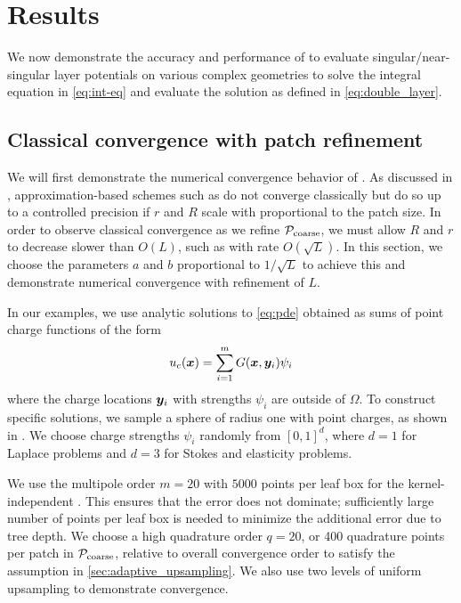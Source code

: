 \section{Results\label{sec:results}}
We now demonstrate the accuracy and performance of \qbkix to evaluate singular/near-singular layer potentials on various complex geometries to solve the integral equation in \cref{eq:int-eq} and evaluate the solution as defined in \cref{eq:double_layer}.

\subsection{Classical convergence with patch refinement}
We will first demonstrate the numerical convergence behavior of \qbkix.
As discussed in \cite[Section 3.1]{KBGN}, approximation-based schemes such as \qbkix do not converge classically but do so up to a controlled precision if $r$ and $R$ scale with proportional to the patch size. 
In order to observe classical convergence as we refine ${\mathcal{P}_{\mathrm{coarse}}}$, we must allow $R$ and $r$ to decrease slower than $O(L)$, such as with rate $O(\sqrt{L})$.
In this section, we choose the \qbkix parameters $a$ and $b$ proportional to $1/\sqrt{L}$ to achieve this and demonstrate numerical convergence with refinement of $L$.

In our examples, we use analytic solutions to \cref{eq:pde} obtained as sums of point charge functions of the form 
\begin{equation}
  u_c({\bm{x}}) = \sum_{i=1}^m G({\bm{x}},{\bm{y}}_i)\psi_i
  \label{eq:point-charge-solution}
\end{equation}
where the charge locations ${\bm{y}}_i$ with strengths $\psi_i$ are outside of $\Omega$.
To construct specific solutions, we sample a sphere of radius one with point charges, as shown in .
We choose charge strengths $\psi_i$ randomly from $[0,1]^d$, where $d=1$ for Laplace problems and $d=3$ for Stokes and elasticity problems. 

We use the multipole order  $m=20$ with $5000$ points per leaf box for the  kernel-independent \fmm. 
This ensures that the \fmm error does not dominate;  sufficiently large number of points per leaf box is needed to minimize the additional error due to tree depth.
We choose a high quadrature order $q=20$, or 400 quadrature points per patch in ${\mathcal{P}_{\mathrm{coarse}}}$, relative to overall convergence order to satisfy the assumption in \cref{sec:adaptive_upsampling}.
We also use two levels of uniform upsampling to demonstrate convergence.


